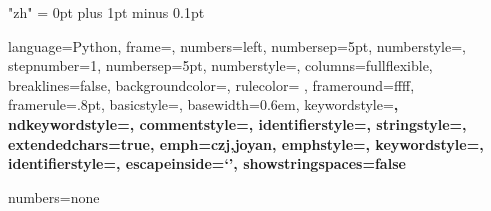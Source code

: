 \XeTeXlinebreaklocale "zh" %
\XeTeXlinebreakskip = 0pt plus 1pt minus 0.1pt %




\usepackage{listings} %



\lstset %
{language=Python,
frame=\leftline\shadowbox,
numbers=left,
numbersep=5pt,
numberstyle=\ttfamily\footnotesize\color{gray},
stepnumber=1,
numbersep=5pt,
numberstyle=\color[RGB]{80,192,192},
columns=fullflexible,
breaklines=false,  %
backgroundcolor=\color{black!10!white},
rulecolor= \color{gray},
frameround=ffff,
framerule=.8pt,  %
basicstyle=\linespread{1.1}\ttfamily\footnotesize, %
basewidth=0.6em,
keywordstyle=\ttfamily\bf\color{colorKeyword},
ndkeywordstyle=\ttfamily\bf\color{colorNdkeyword},
commentstyle=\color{colorComment},
identifierstyle=\ttfamily\color{colorIdentifier}\bfseries,
stringstyle=\color{colorString}\ttfamily,
extendedchars=true,
emph={czj,joyan},
emphstyle=\color{blue}\bfseries,
keywordstyle=\color{blue}\bfseries,
identifierstyle=\color{black}, %
escapeinside=`',
showstringspaces=false
}



 {numbers=none}






